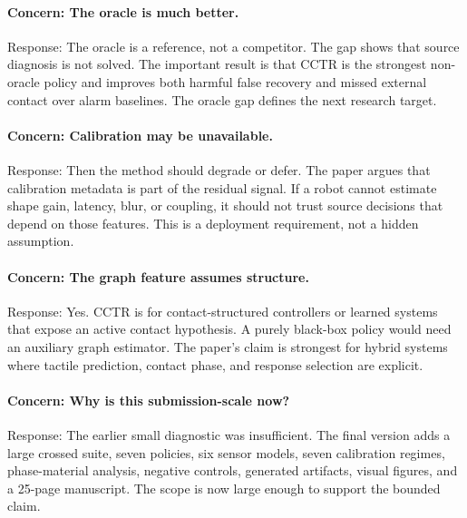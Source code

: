 \documentclass{article}
\newcommand{\method}{CCTR}
\begin{document}
\paragraph{Concern: The oracle is much better.}
Response: The oracle is a reference, not a competitor. The gap shows that source diagnosis is not solved. The important result is that \method{} is the strongest non-oracle policy and improves both harmful false recovery and missed external contact over alarm baselines. The oracle gap defines the next research target.

\paragraph{Concern: Calibration may be unavailable.}
Response: Then the method should degrade or defer. The paper argues that calibration metadata is part of the residual signal. If a robot cannot estimate shape gain, latency, blur, or coupling, it should not trust source decisions that depend on those features. This is a deployment requirement, not a hidden assumption.

\paragraph{Concern: The graph feature assumes structure.}
Response: Yes. \method{} is for contact-structured controllers or learned systems that expose an active contact hypothesis. A purely black-box policy would need an auxiliary graph estimator. The paper's claim is strongest for hybrid systems where tactile prediction, contact phase, and response selection are explicit.

\paragraph{Concern: Why is this submission-scale now?}
Response: The earlier small diagnostic was insufficient. The final version adds a large crossed suite, seven policies, six sensor models, seven calibration regimes, phase-material analysis, negative controls, generated artifacts, visual figures, and a 25-page manuscript. The scope is now large enough to support the bounded claim.
\end{document}
